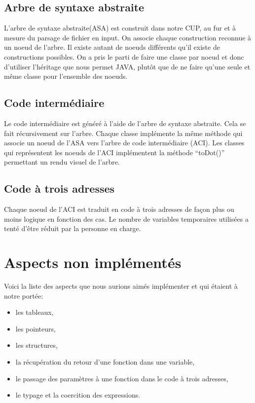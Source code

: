 \documentclass[a4paper,oneside]{article}
\newenvironment{DDbox}[1]{
  \begin{lrbox}{\BBbox}\begin{minipage}{\linewidth}}
    {\end{minipage}\end{lrbox}\noindent\colorbox{Zgris}{\usebox{\BBbox}} \\[.5cm]}
\begin{document}
  
\subsection{Arbre de syntaxe abstraite}
L'arbre de syntaxe abstraite(ASA) est construit dans notre CUP, au fur et à mesure du parsage de fichier en input. On associe chaque construction reconnue à un noeud de l'arbre. Il existe autant de noeuds différents qu'il existe de constructions possibles. On a pris le parti de faire une classe par noeud et donc d'utiliser l'héritage que nous permet JAVA, plutôt que de ne faire qu'une seule et même classe pour l'ensemble des noeuds.

\subsection{Code intermédiaire}
Le code intermédiaire est généré à l'aide de l'arbre de syntaxe abstraite. Cela se fait récursivement sur l'arbre. Chaque classe implémente la même méthode qui associe un noeud de l'ASA vers l'arbre de code intermédiaire (ACI). Les classes qui représentent les noeuds de l'ACI implémentent la méthode ``toDot()'' permettant un rendu visuel de l'arbre.

\subsection{Code à trois adresses}
Chaque noeud de l'ACI est traduit en code à trois adresses de façon plus ou moins logique en fonction des cas. Le nombre de variables temporaires utilisées a tenté d'être réduit par la personne en charge.

    

\newpage
  
    
  \section{Aspects non implémentés}
  Voici la liste des aspects que nous aurions aimés implémenter et qui étaient à notre portée:\\
  \begin{itemize}
  \item les tableaux,
  \item les pointeurs,
  \item les structures,
  \item la récupération du retour d'une fonction dans une variable,
  \item le passage des paramètres à une fonction dans le code à trois adresses,
  \item le typage et la coercition des expressions.
  \end{itemize}
  
\end{document}
